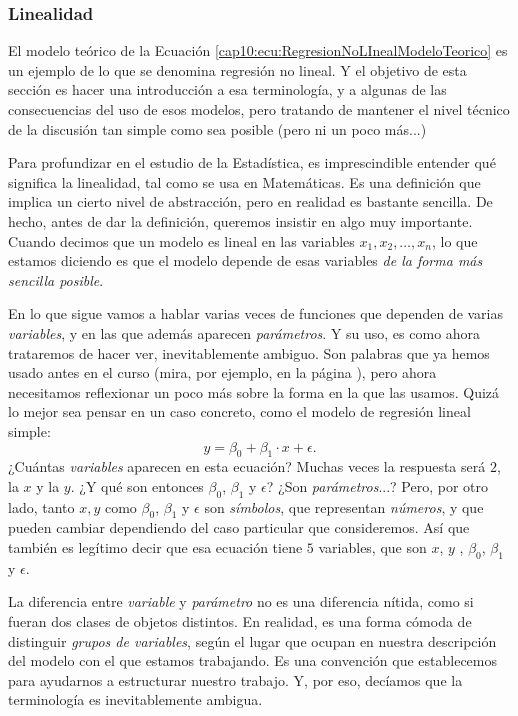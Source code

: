 \subsubsection{Linealidad}
\label{cap10:subsubsec:Linealidad}

El modelo teórico de la Ecuación \ref{cap10:ecu:RegresionNoLInealModeloTeorico} es un ejemplo de lo que se denomina {\sf regresión no lineal}. Y el objetivo de esta sección es hacer una introducción a esa terminología, y a algunas de las consecuencias del uso de esos modelos, pero tratando de mantener el nivel técnico de la discusión tan simple como sea posible (pero ni un poco más...)

Para profundizar en el estudio de la Estadística, es imprescindible entender qué significa la {\sf linealidad}, tal como se usa en Matemáticas. Es una definición que implica un cierto nivel de abstracción, pero en realidad es bastante sencilla. De hecho, antes de dar la definición, queremos insistir en algo muy importante. Cuando decimos que un modelo es lineal en las variables $x_1,x_2,\ldots,x_n$, lo que estamos diciendo es que el modelo depende de esas variables {\em de la forma más sencilla posible}.

En lo que sigue vamos a hablar varias veces de funciones que dependen de varias {\em variables}, y en las que además aparecen {\em parámetros}. Y su uso, es como ahora trataremos de hacer ver, inevitablemente ambiguo. Son palabras que ya hemos usado antes en el curso (mira, por ejemplo, en la página \pageref{cap06:subsubsec:ParametrosEstimadoresSesgo}), pero ahora necesitamos reflexionar un poco más sobre la forma en la que las usamos. Quizá lo mejor sea pensar en un caso concreto, como el modelo de regresión lineal simple:
    \[
        y=\beta_0 +\beta_1\cdot x+\epsilon.
    \]
¿Cuántas {\em variables} aparecen en esta ecuación? Muchas veces la respuesta será $2$, la $x$ y la $y$. ¿Y qué son entonces $\beta_0$, $\beta_1$ y $\epsilon$? ¿Son {\em parámetros}...? Pero, por otro lado, tanto $x, y$ como $\beta_0$, $\beta_1$ y $\epsilon$ son {\em símbolos}, que representan {\em números}, y que pueden cambiar dependiendo del caso particular que consideremos. Así que también es legítimo decir que esa ecuación tiene $5$ variables, que son $x$, $y$ , $\beta_0$, $\beta_1$ y $\epsilon$.

La diferencia entre {\em variable} y {\em parámetro} no es una diferencia nítida, como si fueran dos clases de objetos distintos. En realidad, es una forma cómoda de distinguir {\em grupos de variables}, según el lugar que ocupan en nuestra descripción del modelo con el que estamos trabajando. Es una convención que establecemos para ayudarnos a estructurar nuestro trabajo. Y, por eso, decíamos que la terminología es inevitablemente ambigua.

